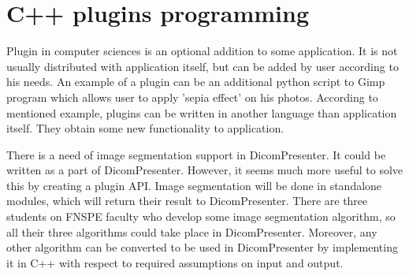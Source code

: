 \section*{C++ plugins programming}

Plugin in computer sciences is an optional addition to some application. It is not usually distributed with application itself, but can be added by user according to his needs. An example of a plugin can be an additional python script to Gimp program which allows user to apply 'sepia effect' on his photos. According to mentioned example, plugins can be written in another language than application itself. They obtain some new functionality to application.

There is a need of image segmentation support in DicomPresenter. It could be written as a part of DicomPresenter. However, it seems much more useful to solve this by creating a plugin API. Image segmentation will be done in standalone modules, which will return their result to DicomPresenter. There are three students on FNSPE faculty who develop some image segmentation algorithm, so all their three algorithms could take place in DicomPresenter. Moreover, any other algorithm can be converted to be used in DicomPresenter by implementing it in C++ with respect to required assumptions on input and output.